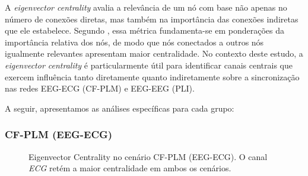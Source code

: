 A \emph{eigenvector centrality} avalia a relevância de um nó com base não apenas no número de conexões diretas, mas também na importância das conexões indiretas que ele estabelece. Segundo \cite{bonacich1972factoring}, essa métrica fundamenta-se em ponderações da importância relativa dos nós, de modo que nós conectados a outros nós igualmente relevantes apresentam maior centralidade. No contexto deste estudo, a \emph{eigenvector centrality} é particularmente útil para identificar canais centrais que exercem influência tanto diretamente quanto indiretamente sobre a sincronização nas redes EEG-ECG (CF-PLM) e EEG-EEG (PLI).

A seguir, apresentamos as análises específicas para cada grupo:

\subsubsection{CF-PLM (EEG-ECG)}
\begin{figure}[htb]
    \centering
    \quad
    \caption{Eigenvector Centrality no cenário CF-PLM (EEG-ECG). O canal \emph{ECG} retém a maior centralidade em ambos os cenários.}
    \label{fig:ec_cfplm_eegecg}
\end{figure}

